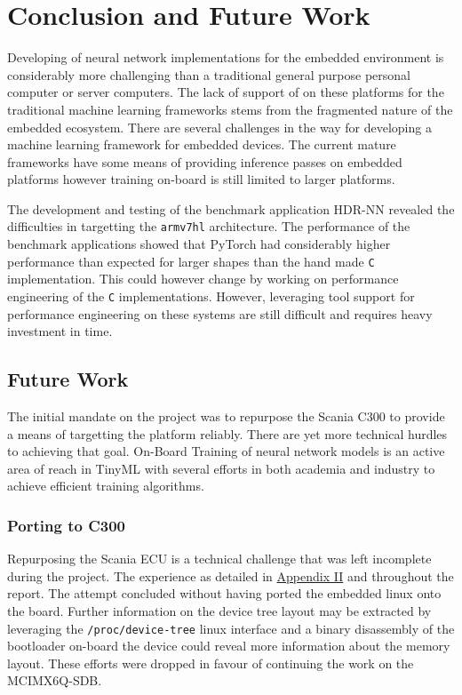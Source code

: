 \chapter{Conclusion and Future Work}

Developing of neural network implementations for the embedded environment is considerably more challenging than a traditional general purpose personal computer or server computers. The lack of support of on these platforms for the traditional machine learning frameworks stems from the fragmented nature of the embedded ecosystem. There are several challenges in the way for developing a machine learning framework for embedded devices. The current mature frameworks have some means of providing inference passes on embedded platforms however training on-board is still limited to larger platforms.

The development and testing of the benchmark application HDR-NN revealed the difficulties in targetting the \texttt{armv7hl} architecture. The performance of the benchmark applications showed that PyTorch had considerably higher performance than expected for larger shapes than the hand made \texttt{C} implementation. This could however change by working on performance engineering of the \texttt{C} implementations. However, leveraging tool support for performance engineering on these systems are still difficult and requires heavy investment in time.

\section{Future Work}

The initial mandate on the project was to repurpose the Scania C300 to provide a means of targetting the platform reliably. There are yet more technical hurdles to achieving that goal. On-Board Training of neural network models is an active area of reach in TinyML with several efforts in both academia and industry to achieve efficient training algorithms.

\subsection{Porting to C300}

Repurposing the Scania ECU is a technical challenge that was left incomplete during the project. The experience as detailed in \hyperref[rtc-c300]{Appendix II} and throughout the report. The attempt concluded without having ported the embedded linux onto the board. Further information on the device tree layout may be extracted by leveraging the \texttt{/proc/device-tree} linux interface and a binary disassembly of the bootloader on-board the device could reveal more information about the memory layout. These efforts were dropped in favour of continuing the work on the MCIMX6Q-SDB.

